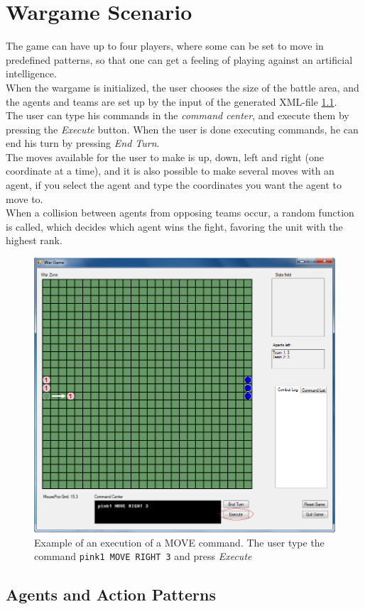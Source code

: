 \section{Wargame Scenario}
\label{sec:wargame}

The game can have up to four players, where some can be set to move in predefined patterns, so that one can get a feeling of playing against an artificial intelligence.\\
	When the wargame is initialized, the user chooses the size of the battle area, and the agents and teams are set up by the input of the generated XML-file \ref{agents_patterns}.\\
	The user can type his commands in the \textit{command center}, and execute them by pressing the \textit{Execute} button. When the user is done executing commands, he can end his turn by pressing \textit{End Turn}.\\
	The moves available for the user to make is up, down, left and right (one coordinate at a time), and it is also possible to make several moves with an agent, if you select the agent and type the coordinates you want the agent to move to.\\
  When a collision between agents from opposing teams occur, a random function is called, which decides which agent wins the fight, favoring the unit with the highest rank.
	
\begin{figure}[H]
\begin{center}
\includegraphics[scale=0.6]{Images/ex_com.png}
\end{center}
\caption{Example of an execution of a MOVE command. The user type the command \texttt{pink1 MOVE RIGHT 3} and press \textit{Execute}}
\label{fig:ex_com}
\end{figure}

\subsection{Agents and Action Patterns}
\label{agents_patterns}
